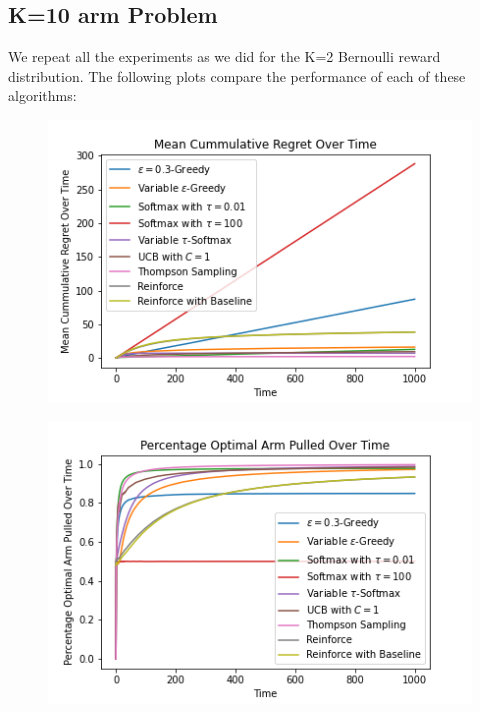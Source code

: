 \documentclass{article}
\begin{document}
	\subsection{K=10 arm Problem}
		We repeat all the experiments as we did for the K=2 Bernoulli reward distribution. The following plots compare the performance of each of these algorithms:
		
		\begin{figure}[H]
			\graphicspath{ {../Experiments/Normal_10_0.01_every_case/} }
			\centering
			\begin{minipage}{.5\textwidth}
			  \centering
			  \includegraphics[width=\linewidth]{Mean_Cummulative_Regret_Over_Time.png}
			  \label{fig:test1}
			\end{minipage}%
			\begin{minipage}{.5\textwidth}
			  \centering
			  \includegraphics[width=\linewidth]{Percentage_Optimal_Arm_Pulled_Over_Time.png}
			  \label{fig:test2}
			\end{minipage}
			\end{figure}
			
\end{document}
